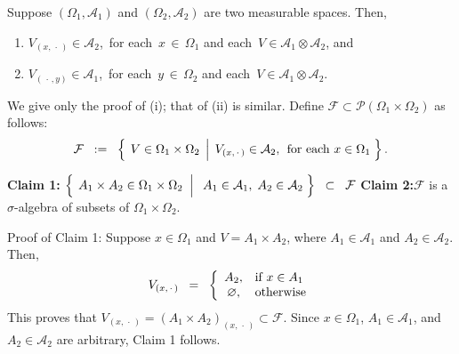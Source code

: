 \begin{theorem}
\label{SectionsOfMeasurableSetsAreMeasurable}
\mbox{}\vskip-0.3cm\noindent
Suppose
$\left(\Omega_{1},\mathcal{A}_{1}\right)$ and $\left(\Omega_{2},\mathcal{A}_{2}\right)$
are two measurable spaces. Then,
\begin{enumerate}
\item	$V_{(x,\,\cdot\,)} \in \mathcal{A}_{2}$,
		\,for each\, $x\,\in\,\Omega_{1}$ and each\, $V \in \mathcal{A}_{1}\otimes\mathcal{A}_{2}$, and
\item	$V_{(\,\cdot\,,y)} \in \mathcal{A}_{1}$,
		\,for each\, $y\,\in\,\Omega_{2}$ and each\, $V \in \mathcal{A}_{1}\otimes\mathcal{A}_{2}$.
\end{enumerate}
\end{theorem}
\proof
We give only the proof of (i); that of (ii) is similar.
Define $\mathcal{F} \subset \mathcal{P}\!\left(\Omega_{1}\times\Omega_{2}\right)$ as follows:
\begin{equation*}
\mathcal{F}
\;\; := \;\;
\left\{\;\left.
V \overset{{\color{white}.}}{\in} \Omega_{1}\times\Omega_{2}
\,\;\right\vert\;
V_{(x,\,\cdot\,)} \in \mathcal{A}_{2},\;\,\textnormal{for each $x\in\Omega_{1}$}
\;\right\}.
\end{equation*}
\begin{center}
\begin{minipage}{6.5in}
\noindent
\textbf{Claim 1:}\quad
	$\left\{\;
	\left.
	A_{1} \times A_{2} \overset{{\color{white}.}}{\in} \Omega_{1} \times \Omega_{2}
	\;\;\right\vert\;\;
	A_{1} \in \mathcal{A}_{1},\;
	A_{2} \in \mathcal{A}_{2}
	\;\right\}
	\;\;\subset\;\; \mathcal{F}$
\vskip 0.5cm
\noindent
\textbf{Claim 2:}\quad $\mathcal{F}$ is a $\sigma$-algebra of subsets of $\Omega_{1}\times\Omega_{2}$.
\end{minipage}
\end{center}
\vskip 0.5cm
Proof of Claim 1:\quad
Suppose $x \in \Omega_{1}$ and
$V = A_{1} \times A_{2}$, where $A_{1} \in \mathcal{A}_{1}$ and $A_{2} \in \mathcal{A}_{2}$.
Then,
\begin{equation*}
V_{(x,\,\cdot\,)}
\;\; = \;\;
\left\{\begin{array}{cl}
A_{2}, & \textnormal{if $x \in A_{1}$} \\
\varnothing, & \textnormal{otherwise}
\end{array}\right.
\end{equation*}
This proves that $V_{(x,\,\cdot\,)} = (A_{1}\times A_{2})_{(x,\,\cdot\,)} \subset \mathcal{F}$.
Since $x \in \Omega_{1}$, $A_{1} \in \mathcal{A}_{1}$, and $A_{2} \in \mathcal{A}_{2}$ are arbitrary,
Claim 1 follows.

